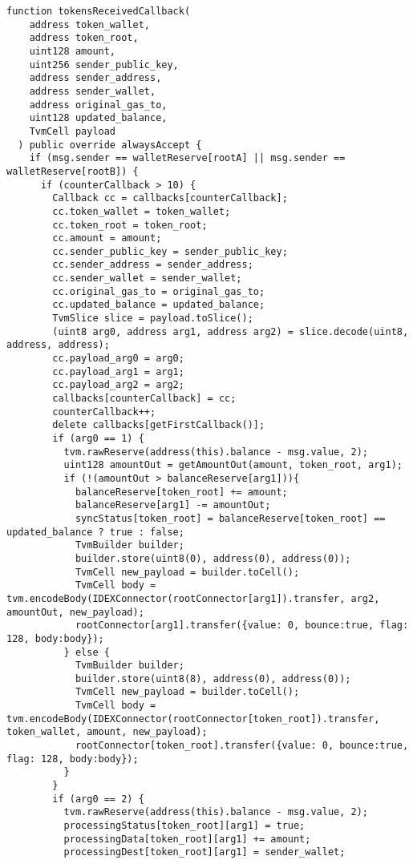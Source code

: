 \begin{lstlisting}[firstnumber=248]
  function tokensReceivedCallback(
    address token_wallet,
    address token_root,
    uint128 amount,
    uint256 sender_public_key,
    address sender_address,
    address sender_wallet,
    address original_gas_to,
    uint128 updated_balance,
    TvmCell payload
  ) public override alwaysAccept {
    if (msg.sender == walletReserve[rootA] || msg.sender == walletReserve[rootB]) {
      if (counterCallback > 10) {
        Callback cc = callbacks[counterCallback];
        cc.token_wallet = token_wallet;
        cc.token_root = token_root;
        cc.amount = amount;
        cc.sender_public_key = sender_public_key;
        cc.sender_address = sender_address;
        cc.sender_wallet = sender_wallet;
        cc.original_gas_to = original_gas_to;
        cc.updated_balance = updated_balance;
        TvmSlice slice = payload.toSlice();
        (uint8 arg0, address arg1, address arg2) = slice.decode(uint8, address, address);
        cc.payload_arg0 = arg0;
        cc.payload_arg1 = arg1;
        cc.payload_arg2 = arg2;
        callbacks[counterCallback] = cc;
        counterCallback++;
        delete callbacks[getFirstCallback()];
        if (arg0 == 1) {
          tvm.rawReserve(address(this).balance - msg.value, 2);
          uint128 amountOut = getAmountOut(amount, token_root, arg1);
          if (!(amountOut > balanceReserve[arg1])){
            balanceReserve[token_root] += amount;
            balanceReserve[arg1] -= amountOut;
            syncStatus[token_root] = balanceReserve[token_root] == updated_balance ? true : false;
            TvmBuilder builder;
            builder.store(uint8(0), address(0), address(0));
            TvmCell new_payload = builder.toCell();
            TvmCell body = tvm.encodeBody(IDEXConnector(rootConnector[arg1]).transfer, arg2, amountOut, new_payload);
            rootConnector[arg1].transfer({value: 0, bounce:true, flag: 128, body:body});
          } else {
            TvmBuilder builder;
            builder.store(uint8(8), address(0), address(0));
            TvmCell new_payload = builder.toCell();
            TvmCell body = tvm.encodeBody(IDEXConnector(rootConnector[token_root]).transfer, token_wallet, amount, new_payload);
            rootConnector[token_root].transfer({value: 0, bounce:true, flag: 128, body:body});
          }
        }
        if (arg0 == 2) {
          tvm.rawReserve(address(this).balance - msg.value, 2);
          processingStatus[token_root][arg1] = true;
          processingData[token_root][arg1] += amount;
          processingDest[token_root][arg1] = sender_wallet;

\end{lstlisting}
